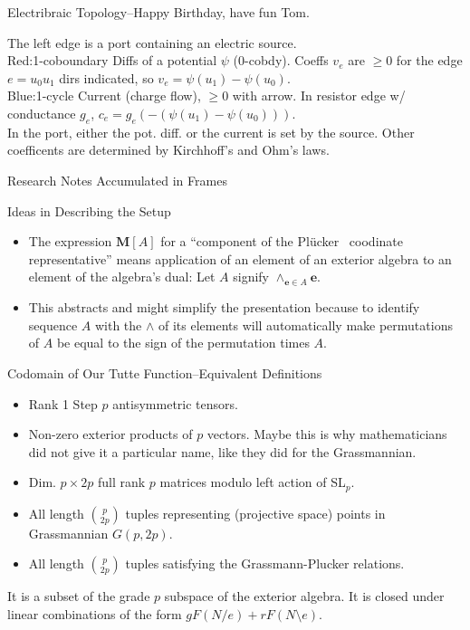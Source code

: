 \documentclass{beamer}
\newcommand{\ext}[1]{\ensuremath{\mathbf{#1}}}
\newcommand{\Plucker}{Pl\"{u}cker\ }
\newcommand{\Remph}[1]{{\color{red}#1}}
\newcommand{\Bemph}[1]{{\color{blue}#1}}
\begin{document}
\begin{frame}{Electribraic Topology--Happy Birthday, have fun Tom.}
  \begin{minipage}{0.5\textwidth}
    The left edge is a port containing an electric source.\\
    \Remph{Red:1-coboundary} Diffs of a potential $\psi$ (0-cobdy).  Coeffs \Remph{$v_e$} are $\ge 0$
    for the edge $e=u_0u_1$ dirs indicated, so \Remph{$v_e=\psi(u_1)-\psi(u_0)$}.\\
    \Bemph{Blue:1-cycle} Current (charge flow), $\ge 0$ with arrow. In resistor edge w/ conductance $g_e$,
    \Bemph{$c_e=g_e(-(\psi(u_1)-\psi(u_0)))$}.\\
    In the port, either the pot. diff. or the current is set by the source.  Other
    coefficents are determined by Kirchhoff's and Ohm's laws.
  \end{minipage}
  \begin{minipage}{0.40\textwidth}
    
  \end{minipage}
\end{frame}


\begin{frame}{Research Notes Accumulated in Frames}
\end{frame}

\begin{frame}{Ideas in Describing the Setup}
  \begin{itemize}
  \item The expression $\ext{M}[A]$ for a ``component of the \Plucker
    coodinate representative'' means application of an element of
    an exterior algebra to an element of the algebra's dual: Let
    $A$ signify $\wedge_{\ext{e}\in A}\ext{e}$.
    \item This abstracts and might simplify the presentation because to
      identify sequence $A$ with the $\wedge$ of its elements will
      automatically make permutations of $A$ be equal to the sign of the
      permutation times $A$.
  \end{itemize}
\end{frame}

\begin{frame}{Codomain of Our Tutte Function--Equivalent Definitions}
  \begin{itemize}
  \item Rank 1 Step $p$ antisymmetric tensors.
  \item Non-zero exterior products of $p$ vectors.  Maybe this is why
    mathematicians did not give it a particular name, like they did
    for the Grassmannian.
  \item Dim. $p \times 2p$ full rank $p$ matrices modulo left action
    of SL$_p$.
  \item All length $\binom{p}{2p}$ tuples representing
    (projective space) points in Grassmannian
    $G(p,2p)$.
    \item All length $\binom{p}{2p}$ tuples satisfying the Grassmann-Plucker relations.
  \end{itemize}
  It is a subset of the grade  $p$ subspace of the exterior algebra.  It is closed under
  linear combinations of the form $g F(N/e) + r F(N\setminus e)$.
\end{frame}
\end{document}
